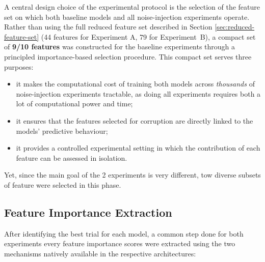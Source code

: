 \documentclass[../main.tex]{subfiles}
\begin{document}
A central design choice of the experimental protocol is the selection of the feature set on which both baseline models and all noise-injection experiments operate.  Rather than using the full reduced feature set described in Section \ref{sec:reduced-feature-set} (44 features for Experiment A, 79 for Experiment~B), a compact set of \textbf{9/10 features} was constructed for the baseline experiments through a principled importance-based selection procedure. This compact set serves three purposes: 
\begin{itemize}
    \item it makes the computational cost of training both models across \emph{thousands} of noise-injection experiments tractable, as doing all experiments requires both a lot of computational power and time;
    \item it ensures that the features selected for corruption are directly linked to the models' predictive behaviour; 
    \item it provides a controlled experimental setting in which the contribution of each feature can be assessed in isolation.
\end{itemize}

Yet, since the main goal of the 2 experiments is very different, tow diverse subsets of feature were selected in this phase. 

\subsection{Feature Importance Extraction}
\label{sec:fi-extraction}

After identifying the best trial for each model, a common step done for both experiments every feature importance scores were extracted using the two mechanisms natively available in the respective architectures:
\end{document}
